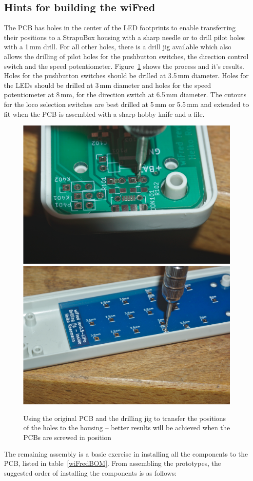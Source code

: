 \documentclass[11pt,a4paper]{scrartcl}
\begin{document}
\subsection{Hints for building the wiFred}

The PCB has holes in the center of the LED footprints to enable transferring their positions to a StrapuBox housing with a sharp needle or to drill pilot holes with a 1\,mm drill. For all other holes, there is a drill jig available which also allows the drilling of pilot holes for the pushbutton switches, the direction control switch and the speed potentiometer. Figure~\ref{transferHoles} shows the process and it's results. Holes for the pushbutton switches should be drilled at 3.5\,mm diameter. Holes for the LEDs should be drilled at 3\,mm diameter and holes for the speed potentiometer at 8\,mm, for the direction switch at 6.5\,mm diameter. The cutouts for the loco selection switches are best drilled at 5\,mm or 5.5\,mm and extended to fit when the PCB is assembled with a sharp hobby knife and a file.

\begin{figure}[tbh]
  \centering
  \includegraphics[width=0.49 \textwidth]{images/_DSC0124}
  \includegraphics[width=0.49 \textwidth]{images/_DSC0128}
  \caption{Using the original PCB and the drilling jig to transfer the positions of the holes to the housing -- better results will be achieved when the PCBs are screwed in position}
  \label{transferHoles}
\end{figure}

The remaining assembly is a basic exercise in installing all the components to the PCB, listed in table~\ref{wiFredBOM}. From assembling the prototypes, the suggested order of installing the components is as follows:
\end{document}

